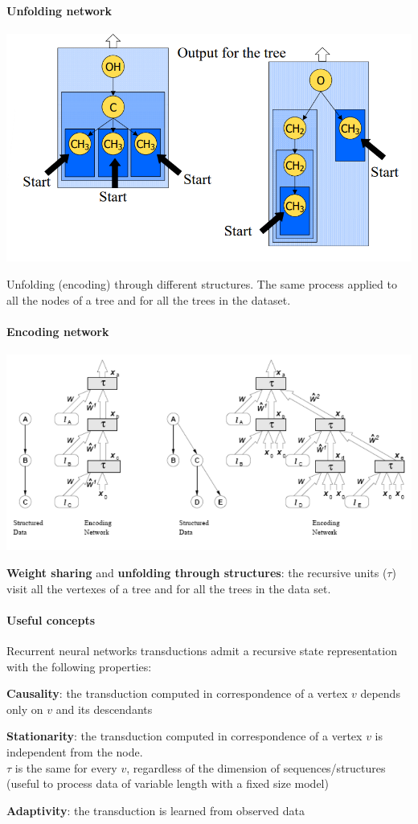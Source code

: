 \documentclass[10pt]{report}
\begin{document}
\paragraph{Unfolding network}
\begin{center}
	\includegraphics[scale=0.5]{55.png}
\end{center}
Unfolding (encoding) through different structures. The same process applied to all the nodes of a tree and for all the trees in the dataset.
\pagebreak
\paragraph{Encoding network} 
\begin{center}
	\includegraphics[scale=0.5]{43.png}
\end{center}
\textbf{Weight sharing} and \textbf{unfolding through structures}: the recursive units ($\tau$) visit all the vertexes of a tree and for all the trees in the data set.
\paragraph{Useful concepts} Recurrent neural networks transductions admit a recursive state representation with the following properties:
\begin{list}{}{}
	\item \textbf{Causality}: the transduction computed in correspondence of a vertex $v$ depends only on $v$ and its descendants
	\item \textbf{Stationarity}: the transduction computed in correspondence of a vertex $v$ is independent from the node.\\
	$\tau$ is the same for every $v$, regardless of the dimension of sequences/structures (useful to process data of variable length with a fixed size model)
	\item \textbf{Adaptivity}: the transduction is learned from observed data
\end{list}
\end{document}
